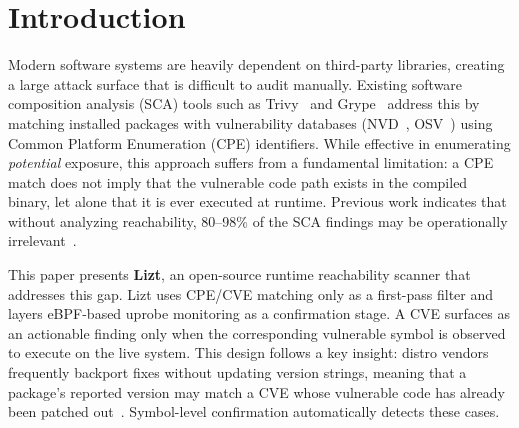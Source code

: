 \documentclass[conference]{IEEEtran}
\begin{document}
\section{Introduction}

Modern software systems are heavily dependent on third-party libraries, creating a large attack surface that is difficult to audit manually. Existing software composition analysis (SCA) tools such as Trivy~\cite{trivy} and Grype~\cite{grype} address this by matching installed packages with vulnerability databases (NVD~\cite{nvd}, OSV~\cite{osv}) using Common Platform Enumeration (CPE) identifiers. While effective in enumerating \textit{potential} exposure, this approach suffers from a fundamental limitation: a CPE match does not imply that the vulnerable code path exists in the compiled binary, let alone that it is ever executed at runtime. Previous work indicates that without analyzing reachability, 80--98\% of the SCA findings may be operationally irrelevant~\cite{konvu2026}.

This paper presents \textbf{Lizt}, an open-source runtime reachability scanner that addresses this gap. Lizt uses CPE/CVE matching only as a first-pass filter and layers eBPF-based uprobe monitoring as a confirmation stage. A CVE surfaces as an actionable finding only when the corresponding vulnerable symbol is observed to execute on the live system. This design follows a key insight: distro vendors frequently backport fixes without updating version strings, meaning that a package's reported version may match a CVE whose vulnerable code has already been patched out~\cite{redhat_backporting}. Symbol-level confirmation automatically detects these cases.
\end{document}
